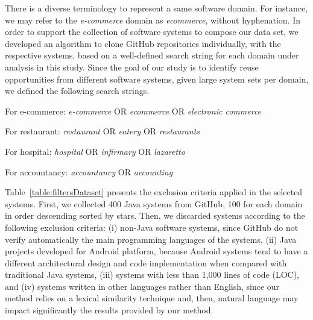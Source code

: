 There is a diverse terminology to represent a same software domain. For instance, we may refer to the \textit{e-commerce} domain as \textit{ecommerce}, without hyphenation. In order to support the collection of software systems to compose our data set, we developed an algorithm to clone GitHub repositories individually, with the respective systems, based on a well-defined search string for each domain under analysis in this study. Since the goal of our study is to identify reuse opportunities from different software systems, given large system sets per domain, we defined the following search strings.


\begin{center}
For e-commerce: \textit{e-commerce} OR \textit{ecommerce} OR \textit{electronic commerce}

For restaurant: \textit{restaurant} OR \textit{eatery} OR \textit{restaurants}

For hospital: \textit{hospital} OR \textit{infirmary} OR  \textit{lazaretto}

For accountancy:  \textit{accountancy} OR \textit{accounting}
\end{center}





Table~\ref{table:filtersDataset} presents the exclusion criteria applied in the selected systems. First, we collected 400 Java systems from GitHub, 100 for each domain in order descending sorted by stars. Then, we discarded systems according to the following exclusion criteria: (i) non-Java software systems, since GitHub do not verify automatically the main programming languages of the systems, (ii) Java projects developed for Android platform, because Android systems tend to have a different architectural design and code implementation when compared with traditional Java systems, (iii) systems with less than 1,000 lines of code (LOC), and (iv) systems written in other languages rather than English, since our method relies on a lexical similarity technique and, then, natural language may impact significantly the results provided by our method. 

